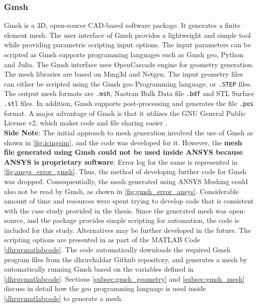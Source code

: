 \documentclass[english]{kththesis}
\begin{document}
\subsubsection {Gmsh}
\label{subsubsec:gmsh}
Gmsh is a 3D, open-source CAD-based software package. It generates a finite element mesh. The user interface of Gmsh provides a lightweight and simple tool while providing parametric scripting input options. The input parameters can be scripted as Gmsh supports programming languages such as Gmsh geo, Python and Julia. The Gmsh interface uses OpenCascade engine for geometry generation. The mesh libraries are based on Mmg3d and Netgen. The input geometry files can either be scripted using the Gmsh geo Programming language, or \lstinline{.STEP} files. The output mesh formats are \lstinline{.msh}, Nastran Bulk Data file \lstinline{.bdf} and STL Surface \lstinline{.stl} files. In addition, Gmsh supports post-processing and generates the file \lstinline{.pos} format. A major advantage of Gmsh is that it utilizes the GNU General Public License v2, which makes code and file sharing easier \cite{gmsh}.\\
\textbf{Side Note}: The initial approach to mesh generation involved the use of Gmsh as shown in  \ref{fig:icingsim}, and the code was developed for it. However, the \textbf{mesh file generated using Gmsh could not be used inside ANSYS because ANSYS is proprietary software}. Error log for the same is represented in \ref{fig:ansys_error_gmsh}. Thus, the method of developing further code for Gmsh was dropped. Consequentially, the mesh generated using ANSYS Meshing could also not be read by Gmsh, as shown in \ref{fig:gmsh_error_ansys}. Considerable amount of time and resources were spent trying to develop code that is consistent with the case study provided in the thesis. Since the generated mesh was open-source, and the package provides simple scripting for automation, the code is included for this study. Alternatives may be further developed in the future. The scripting options are presented in as part of the MATLAB Code \ref{dhruvmatlabcode}. The code automatically downloads the required Gmsh program files from the dhruvhaldar Github repository, and generates a mesh by automatically running Gmsh based on the variables defined in \ref{dhruvmatlabcode}. Sections \ref{subsec:gmsh_geometry}  and \ref{subsec:gmsh_mesh} discuss in detail how the geo programming language is used inside \ref{dhruvmatlabcode} to generate a mesh.
\end{document}
